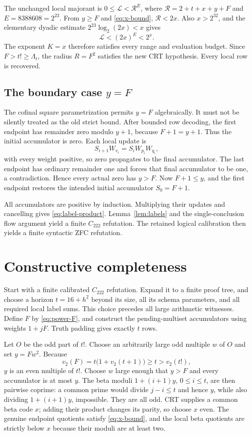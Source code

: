 \documentclass[11pt]{article}
\theoremstyle{definition}
\newcommand{\LL}{\mathcal L}
\begin{document}
The unchanged local majorant is
$0\le\LL<\mathcal R^E$, where
$\mathcal R=2+t+x+y+F$ and $E=8388608=2^{23}$.
From $y\ge F$ and \eqref{eq:x-bound}, $\mathcal R<2x$.
Also $x>2^{32}$, and the elementary dyadic estimate
$2^{23}\log_2(2x)<x$ gives
\[
                  \LL<(2x)^E<2^x.
\]
The exponent $K=x$ therefore satisfies every range and evaluation budget.
Since $F>t!\ge\Lambda_t$, the radius $R=F^2$ satisfies the new
CRT hypothesis. Every local row is recovered.

\subsection{The boundary case \texorpdfstring{$y=F$}{y = F}}

The cofinal square parametrization permits $y=F$ algebraically. It must
not be silently treated as the old strict bound. After bounded row
decoding, the first endpoint has remainder zero modulo $y+1$, because
$F+1=y+1$. Thus the initial accumulator is zero. Each local update is
\[
 S_{i+1}W_{v_i}=S_iW_{p_i}W_{q_i},
\]
with every weight positive, so zero propagates to the final accumulator.
The last endpoint has ordinary remainder one and forces that final
accumulator to be one, a contradiction. Hence every actual zero has
$y>F$. Now $F+1\le y$, and the first endpoint restores the intended
initial accumulator $S_0=F+1$.

All accumulators are positive by induction. Multiplying their updates
and cancelling gives \eqref{eq:label-product}. Lemma~\ref{lem:labels}
and the single-conclusion flow argument yield a finite $C_{222}$
refutation. The retained logical calibration then yields a finite
syntactic ZFC refutation.

\section{Constructive completeness}

Start with a finite calibrated $C_{222}$ refutation. Expand it to a finite
proof tree, and choose a horizon $t=16+h^2$ beyond its size, all its
schema parameters, and all required local label sums. This choice precedes
all large arithmetic witnesses. Define $F$ by \eqref{eq:power-F}, and
construct the pending-multiset accumulators using weights $1+jF$.
Truth padding gives exactly $t$ rows.

Let $O$ be the odd part of $t!$. Choose an arbitrarily large odd multiple
$w$ of $O$ and set $y=Fw^2$. Because
\[
 v_2(F)=t\bigl(1+v_2(t+1)\bigr)\ge t>v_2(t!),
\]
$y$ is an even multiple of $t!$. Choose $w$ large enough that $y>F$
and every accumulator is at most $y$. The beta moduli
$1+(i+1)y$, $0\le i\le t$, are then pairwise coprime: a common
prime would divide $j-i\le t$ and hence $y$, while also dividing
$1+(i+1)y$, impossible. They are all odd. CRT supplies a common beta
code $x$; adding their product changes its parity, so choose $x$ even.
The genuine endpoint quotients satisfy \eqref{eq:x-bound}, and the local
beta quotients are strictly below $x$ because their moduli are at least two.
\end{document}
